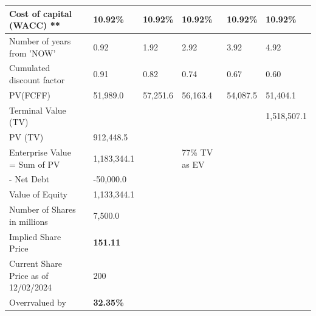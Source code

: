 \begin{table}[]
\begin{tabular}{@{}lllllll@{}}
    \textbf{Cost of capital (WACC) **}              &           & 10.92\%     & 10.92\%   & 10.92\%       & 10.92\%   & 10.92\%     \\\midrule[2pt]
    Number of years from 'NOW'           &           & 0.92        & 1.92      & 2.92          & 3.92      & 4.92        \\
    Cumulated discount factor            &           & 0.91        & 0.82      & 0.74          & 0.67      & 0.60        \\
    PV(FCFF)                             &           & 51,989.0    & 57,251.6  & 56,163.4      & 54,087.5  & 51,404.1    \\ \midrule
    Terminal Value (TV)                  &           &             &           &               &           & 1,518,507.1 \\
    PV (TV)                              &           & 912,448.5   &           &               &           &             \\
    Enterprise Value = Sum of PV         &           & 1,183,344.1 &           & 77\% TV as EV &           &             \\
    - Net Debt                           &           & -50,000.0   &           &               &           &             \\
    Value of Equity                      &           & 1,133,344.1 &           &               &           &             \\
    Number of Shares in millions         &           & 7,500.0     &           &               &           &             \\
    Implied Share Price                  &           & \textbf{151.11  }    &           &               &           &             \\
    Current Share Price as of 12/02/2024 &           & 200         &           &               &           &             \\
    Overrvalued by                       &           & \textbf{32.35\% }    &           &               &           &             \\ \bottomrule
    \end{tabular}
    \end{table}



